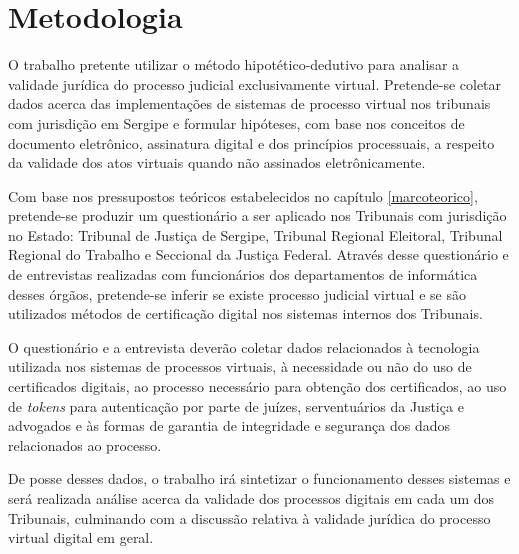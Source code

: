  \chapter{Metodologia}

	O trabalho pretente utilizar o método hipotético-dedutivo para
  analisar a validade jurídica do processo judicial
  exclusivamente virtual. Pretende-se coletar dados acerca das
  implementações de sistemas de processo virtual nos tribunais
  com jurisdição em Sergipe e formular hipóteses, com base nos
  conceitos de documento eletrônico, assinatura digital e dos
  princípios processuais, a respeito da validade dos atos
  virtuais quando não assinados eletrônicamente.\par

  Com base nos pressupostos teóricos estabelecidos no capítulo
  \ref{marcoteorico}, pretende-se produzir um questionário a ser
  aplicado nos Tribunais com jurisdição no Estado: Tribunal de
  Justiça de Sergipe, Tribunal Regional Eleitoral, Tribunal
  Regional do Trabalho e Seccional da Justiça Federal. Através
  desse questionário e de entrevistas realizadas com funcionários
  dos departamentos de informática desses órgãos, pretende-se
  inferir se existe processo judicial virtual e se são utilizados
  métodos de certificação digital nos sistemas internos dos
  Tribunais. \par

  O questionário e a entrevista deverão coletar dados
  relacionados à tecnologia utilizada nos sistemas de processos
  virtuais, à necessidade ou não do uso de certificados
  digitais, ao processo necessário para obtenção dos
  certificados, ao uso de \emph{tokens} para autenticação por
  parte de juízes, serventuários da Justiça e advogados e às
  formas de garantia de integridade e segurança dos dados
  relacionados ao processo.\par

  De posse desses dados, o trabalho irá sintetizar o
  funcionamento desses sistemas e será realizada análise acerca
  da validade dos processos digitais em cada um dos
  Tribunais, culminando com a discussão relativa à validade
  jurídica do processo virtual digital em geral.\par
